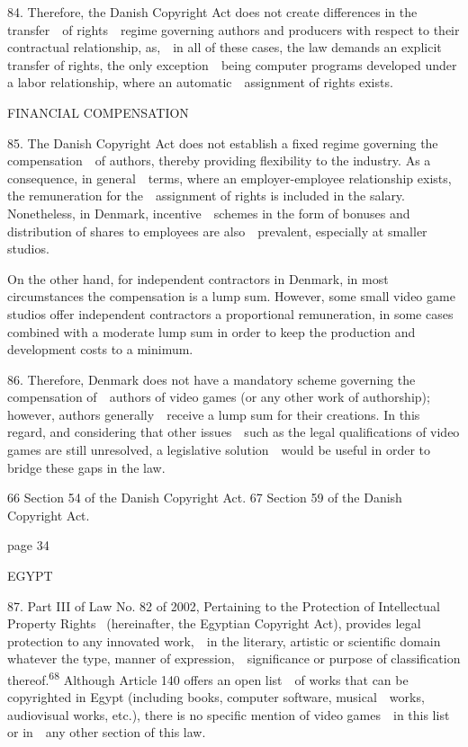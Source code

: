 \documentclass[
]{article}
\begin{document}
{84. }{Therefore, the Danish }{Copyright Act }{does not create
differences in the transfer~~of rights~~regime governing authors and
producers with respect to their contractual relationship, as,~~in all of
these cases, the law demands an explicit transfer of rights, the only
exception~~being computer programs developed under a labor relationship,
where an automatic~~assignment of rights exists.}

{FINANCIAL COMPENSATION}

{85. }{The Danish }{Copyright Act }{does not establish a fixed regime
governing the compensation~~of authors, thereby providing flexibility to
the industry. As a consequence, in general~~terms, where an
employer-employee relationship exists, the remuneration for
the~~assignment of rights is included in the salary. Nonetheless, in
Denmark, incentive~~schemes in the form of bonuses and distribution of
shares to employees are also~~prevalent, especially at smaller studios.}

{On the other hand, for independent contractors in Denmark, in most
circumstances the compensation is a lump sum. However, some small video
game studios offer independent contractors a proportional remuneration,
in some cases combined with a moderate lump sum in order to keep the
production and development costs to a minimum.}

{86. }{Therefore, Denmark does not have a mandatory scheme governing the
compensation of~~authors of video games (or any other work of
authorship); however, authors generally~~receive a lump sum for their
creations. In this regard, and considering that other issues~~such as
the legal qualifications of video games are still unresolved, a
legislative solution~~would be useful in order to bridge these gaps in
the law.}

{66 }{Section 54 of the Danish }{Copyright Act}{. }{67 }{Section 59 of
the Danish }{Copyright Act}{.}

{page 34}

{EGYPT}

{87. }{Part III of Law No. 82 of 2002, }{Pertaining to the Protection of
Intellectual Property Rights }{~(hereinafter, the Egyptian }{Copyright
Act}{), provides legal protection to }{any innovated work,~~in the
literary, artistic or scientific domain whatever the type, manner of
expression,~~significance or purpose of classification
thereof.}\textsuperscript{{68 }}{Although Article 140 offers an open
list~~of works that can be copyrighted in Egypt (including books,
computer software, musical~~works, audiovisual works, etc.), there is no
specific mention of video games~~in this list or in~~any other section
of this law.}
\end{document}
